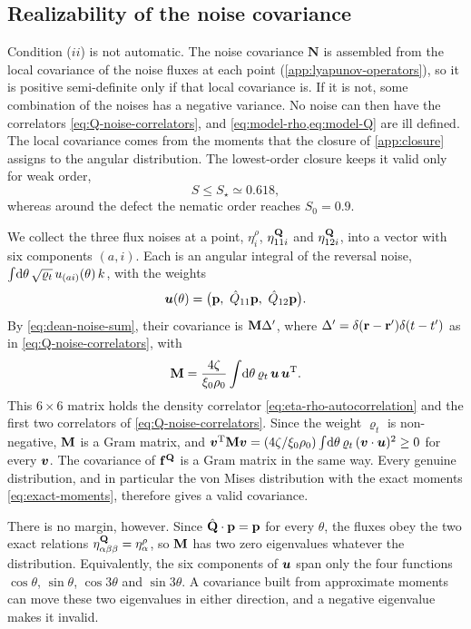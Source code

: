 \documentclass[aps,pre,reprint,superscriptaddress,longbibliography,nofootinbib
]{revtex4-2}
\begin{document}
\subsection{Realizability of the noise covariance}
\label{app:realizability}
Condition ($ii$) is not automatic. The noise covariance
$\mathbf N$ is assembled from the local covariance of the
noise fluxes at each point (\cref{app:lyapunov-operators}),
so it is positive semi-definite only if that local
covariance is. If it is not, some combination of the noises
has a negative variance. No noise can then have the
correlators \cref{eq:Q-noise-correlators}, and
\cref{eq:model-rho,eq:model-Q} are ill defined. The local
covariance comes from the moments that the closure of
\cref{app:closure} assigns to the angular distribution. The
lowest-order closure keeps it valid only for weak order,
\begin{equation}
  \label{eq:realizability-condition}
  S\le S_\star \simeq 0.618,
\end{equation}
whereas around the defect the nematic order reaches
$S_0=0.9$.

We collect the three flux noises at a point, $\eta^\rho_i$,
$\eta^{\mathbf{Q}}_{11i}$ and $\eta^{\mathbf{Q}}_{12i}$, into a vector with six
components $(a,i)$. Each is an angular integral of the
reversal noise,
$\int\!\mathrm{d}\theta\,\sqrt{\varrho_t}\,u_{(ai)}(\theta)\,k$,
with the weights
\begin{equation}
  \label{eq:u-vector}
  \boldsymbol u(\theta)=\bigl(\mathbf{p},\ \hat Q_{11}\mathbf{p},\ \hat Q_{12}\mathbf{p}\bigr).
\end{equation}
By \cref{eq:dean-noise-sum}, their covariance is
$\mathbf{M}\Delta'$, where $\Delta'=\delta(\mathbf{r}-\mathbf{r}')\delta(t-t')$ as
in \cref{eq:Q-noise-correlators}, with
\begin{equation}
  \label{eq:gram-matrix}
  \mathbf{M}=\frac{4\zeta}{\xi_0\rho_0}\int\!\mathrm{d}\theta\,\varrho_t\,\boldsymbol u\,\boldsymbol u^{\mathrm{T}} .
\end{equation}
This $6\times6$ matrix holds the density correlator
\cref{eq:eta-rho-autocorrelation} and the first two
correlators of \cref{eq:Q-noise-correlators}. Since the
weight $\varrho_t$ is non-negative, $\mathbf{M}$ is a Gram matrix,
and $\boldsymbol v^{\mathrm{T}}\mathbf{M}\boldsymbol
v=(4\zeta/\xi_0\rho_0)\int\!\mathrm{d}\theta\,\varrho_t\,(\boldsymbol
v\cdot\boldsymbol u)^2\ge0$ for every $\boldsymbol v$. The covariance of
$\mathbf{f}^{\mathbf{Q}}$ is a Gram matrix in the same way. Every genuine
distribution, and in particular the von Mises distribution
with the exact moments \cref{eq:exact-moments}, therefore
gives a valid covariance.

There is no margin, however. Since $\hat{\mathbf{Q}}\cdot\mathbf{p}=\mathbf{p}$ for
every $\theta$, the fluxes obey the two exact relations
$\eta^{\mathbf{Q}}_{\alpha\beta\beta}=\eta^\rho_\alpha$, so $\mathbf{M}$ has
two zero eigenvalues whatever the distribution.
Equivalently, the six components of $\boldsymbol u$ span only the
four functions $\cos\theta$, $\sin\theta$, $\cos3\theta$
and $\sin3\theta$. A covariance built from approximate
moments can move these two eigenvalues in either direction,
and a negative eigenvalue makes it invalid.
\end{document}
